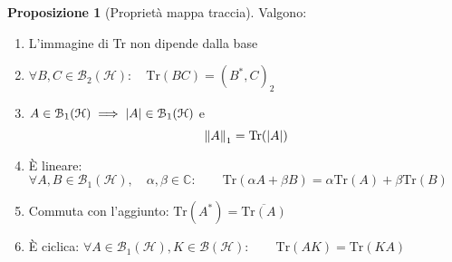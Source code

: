 \documentclass[a4paper,10pt]{article}
\theoremstyle{definition}
\newcommand{\im}{\mathbb{C}} %
\newcommand{\hil}{\mathcal{H}} %
\theoremstyle{indentdefinition}
\theoremstyle{indenttheorem}
\newtheorem{prop}{Proposizione}
\theoremstyle{myremark}
\theoremstyle{indentgeneral}
\newenvironment{myboxed} 
{\noindent\begin{lrbox}{\mybox}\begin{minipage}{\textwidth}}
{\end{minipage}\end{lrbox}\fbox{\usebox{\mybox}}}
\begin{document}
\begin{myboxed}
\begin{prop}[Proprietà mappa traccia] Valgono:
\begin{enumerate}
    \item L'immagine di Tr non dipende dalla base
    \item $\forall B,C\in\mathcal{B}_2(\hil):\quad \text{Tr}(BC)=(B^*,C)_2$
    \item $A\in\mathcal{B}_1(\hil) \implies \abs{A}\in\mathcal{B}_1(\hil)$ e 
    $$\norm{A}_1=\text{Tr}(\abs{A})$$
    \item È lineare: $\forall A,B\in\mathcal{B}_1(\hil),\quad \alpha,\beta\in \im:\qquad\text{Tr}(\alpha A+\beta B)=\alpha\text{Tr}(A)+\beta\text{Tr} (B)$
    \item Commuta con l'aggiunto: $\text{Tr}(A^*)=\overline{\text{Tr}(A)}$
    \item È ciclica: $\forall A\in \mathcal{B}_1(\hil),K\in \mathcal{B}(\hil): \qquad \text{Tr}(AK)=\text{Tr}(KA)$
\end{enumerate}
\end{prop}
\end{myboxed}
\end{document}
